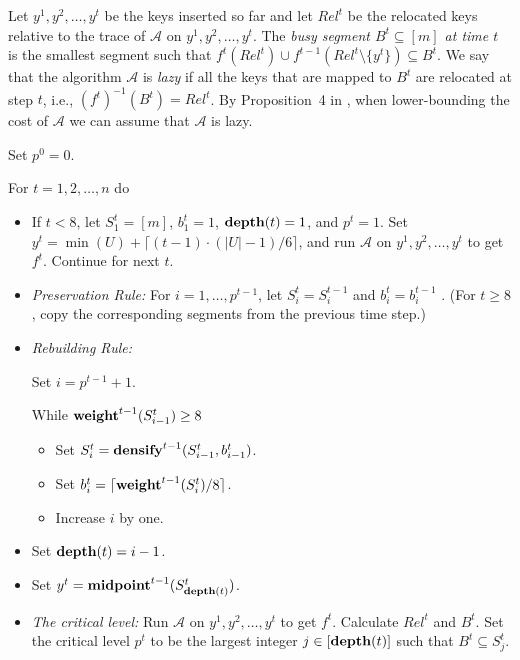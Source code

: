 \documentclass[runningheads,a4paper]{llncs}
\newcommand{\A}{\mathcal{A}}
\newcommand{\weight}{{\rm {\bf weight}}}
\newcommand{\midp}{{\rm {\bf midpoint}}}
\newcommand{\depth}{{\rm {\bf depth}}}
\newcommand{\densify}{{\rm {\bf densify}}}
\begin{document}
Let $y^1,y^2,\dots,y^t$ be the keys inserted so far and let $Rel^t$ be the relocated keys relative to 
the trace of $\A$ on $y^1,y^2,\dots,y^t$. The \emph{busy segment $B^t\subseteq [m]$ at time $t$} is
the smallest segment such that $f^t(Rel^t)\cup f^{t-1}(Rel^t \setminus \{y^t\}) \subseteq B^t$. 
We say that the algorithm $\A$ is \emph{lazy} if
all the keys that are mapped to $B^t$ are relocated at step $t$, i.e., $(f^t)^{-1}(B^t) = Rel^t$. 
By Proposition~4 in \cite{BKS}, when lower-bounding the cost of $\A$ 
we can assume that $\A$ is lazy.

\medskip\noindent {\bf Adversary($\A,n,m,r$)}

\smallskip\noindent Set $p^0=0$.

\smallskip\noindent For $t=1,2,\dots,n$ do

\begin{itemize}
\item
If $t < 8$, let $S^t_1 = [m]$, $b^t_1=1$, $\depth(t)=1$, and $p^{t}=1$.   
Set $y^t = \min(U) + \lceil (t-1) \cdot (|U|-1)/6 \rceil$, and run $\A$ on $y^1,y^2,\dots,y^t$ to get $f^t$.
Continue for next $t$.

\item
\emph{Preservation Rule:}
For $i=1,\dots,p^{t-1}$, let $S^t_i=S^{t-1}_{i}$ and $b^t_i=b^{t-1}_i$ . 
(For $t\ge 8$, copy the corresponding segments from the previous time step.)

\item 
\emph{Rebuilding Rule:}

Set $i=p^{t-1}+1$.

While $\weight^{t-1}(S^t_{i-1}) \ge 8$

\begin{itemize}
\item Set $S^t_i = \densify^{t-1}(S^t_{i-1},b^t_{i-1})$.
\item Set $b^t_i = \lceil \weight^{t-1}(S^t_i)/8 \rceil$.
\item Increase $i$ by one.
\end{itemize}

\item
Set $\depth(t)=i-1$.

\item 
Set $y^t = \midp^{t-1}(S^t_{\depth(t)})$.

\item
\emph{The critical level:}
Run $\A$ on $y^1,y^2,\dots,y^t$ to get $f^t$. Calculate $Rel^t$ and $B^t$.
Set the critical level $p^{t}$ to be the largest integer $j\in [\depth(t)]$ such that $B^{t} \subseteq S^{t}_j$.

\end{itemize}
\end{document}
